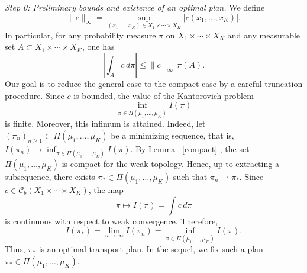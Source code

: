 \documentclass[twoside,11pt,a4paper]{article}
\newcommand*{\SavedRef}{}
\let\SavedRef\ref
\renewcommand*{\ref}[1]{  \begingroup
    \hypersetup{
      linkcolor=linkequation,
      linkbordercolor=linkequation,
    }    \SavedRef{#1}  \endgroup
}
\begin{document}
\medskip
\noindent\emph{Step 0: Preliminary bounds and existence of an optimal plan.}
We define
\[
\|c\|_\infty
=
\sup_{(x_1,\dots,x_K)\in X_1\times\cdots\times X_K}
\big|c(x_1,\dots,x_K)\big|.
\]
In particular, for any probability measure $\pi$ on
$X_1\times\cdots\times X_K$ and any measurable set
$A \subset X_1\times\cdots\times X_K$, one has
\[
\left|\int_A c\, d\pi\right|
\le
\|c\|_\infty\,\pi(A).
\]
Our goal is to reduce the general case to the compact case by a careful
truncation procedure.
Since $c$ is bounded, the value of the Kantorovich problem
\[
\inf_{\pi \in \Pi(\mu_1,\dots,\mu_K)} I(\pi)
\]
is finite. Moreover, this infimum is attained. Indeed, let
$(\pi_n)_{n\ge1}\subset \Pi(\mu_1,\dots,\mu_K)$ be a minimizing sequence, that is,
$
I(\pi_n)\longrightarrow
\inf_{\pi\in\Pi(\mu_1,\dots,\mu_K)} I(\pi).
$
By Lemma~\ref{compact}, the set $\Pi(\mu_1,\dots,\mu_K)$ is compact for the weak
topology. Hence, up to extracting a subsequence, there exists
$\pi_*\in\Pi(\mu_1,\dots,\mu_K)$ such that
$
\pi_n \rightharpoonup \pi_* .
$
Since $c\in \mathcal C_b(X_1\times\cdots\times X_K)$, the map
\[
\pi\longmapsto I(\pi)=\int c\,d\pi
\]
is continuous with respect to weak convergence. Therefore,
\[
I(\pi_*)
=
\lim_{n\to\infty} I(\pi_n)
=
\inf_{\pi\in\Pi(\mu_1,\dots,\mu_K)} I(\pi).
\]
Thus, $\pi_*$ is an optimal transport plan. In the sequel, we fix such a plan
$\pi_* \in \Pi(\mu_1,\dots,\mu_K)$.
\end{document}
